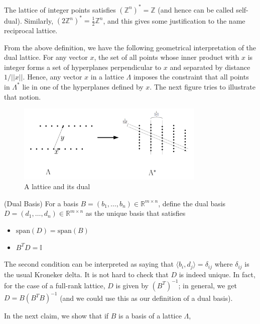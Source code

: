 \begin{example}
  The lattice of integer points satisfies $(\mathbb{Z}^n)^*=\mathbb{Z}$ (and
  hence can be called self-dual). Similarly, $(2\mathbb{Z}^n)^*
  = \frac{1}{2}\mathbb{Z}^n$, and this gives some justification to the name 
  reciprocal lattice.
\end{example}
\par From the above definition, we have the following geometrical
interpretation of the dual lattice. For any vector $x$, the set of all
points whose inner product with $x$ is integer forms a set of hyperplanes
perpendicular to $x$ and separated by distance $1/||x||$. Hence, any vector
$x$ in a lattice $\Lambda$ imposes the constraint that all points
in $\Lambda^*$ lie in one of the hyperplanes defined by $x$. The next figure
tries to illustrate that notion.
\begin{figure}[h!]
  \centering
\includegraphics[width=0.8\textwidth]{Images/duallattice.png}
  \caption{A lattice and its dual}
\end{figure}
\begin{definition}(Dual Basis)
  For a basis $B=(b_1,\dots,b_n)\in\mathbb{R}^{m\times n}$, define the dual
  basis $D=(d_1,\dots,d_n)\in \mathbb{R}^{m\times n}$ as the unique basis that
  satisfies
  \begin{itemize}
    \item $\mathrm{span}(D) = \mathrm{span}(B)$
    \item $B^TD = \mathbb{I}$
  \end{itemize}
\end{definition}
\par The second condition can be interpreted as saying that $\langle b_i,
d_j\rangle = \delta_{ij}$ where $\delta_{ij}$ is the usual Kroneker delta. It
is not hard to check that $D$ is indeed unique. In fact, for the case of
a full-rank lattice, $D$ is given by $(B^T)^{-1}$; in general, we get $D=B(B^T
B)^{-1}$ (and we could use this as our definition of a dual basis).
\par In the next claim, we show that if $B$ is a basis of a lattice $\Lambda$,
